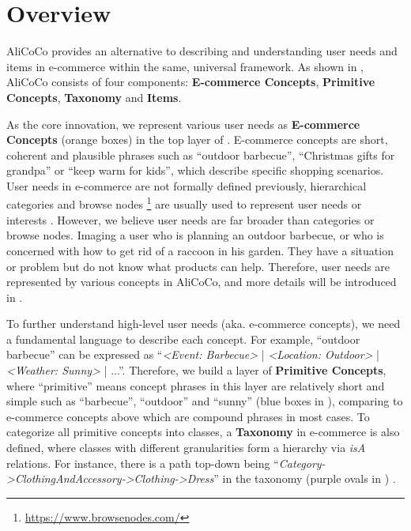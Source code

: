 \section{Overview} 
\label{sec:overview}


AliCoCo provides an alternative to describing and understanding user needs and items in e-commerce within the same, universal framework.
As shown in , 
AliCoCo consists of four components:
\textbf{E-commerce Concepts}, \textbf{Primitive Concepts}, \textbf{Taxonomy} and \textbf{Items}.


As the core innovation, 
we represent various user needs as \textbf{E-commerce Concepts} (orange boxes) in the top layer of .
E-commerce concepts are short, coherent and plausible phrases such as ``outdoor barbecue'', ``Christmas gifts for grandpa''
or ``keep warm for kids'', which describe specific shopping scenarios.
User needs in e-commerce are not formally defined previously,
hierarchical categories and browse nodes \footnote{\url{https://www.browsenodes.com/}} are usually used to represent user needs or interests \cite{zhou2018deep}.
However, we believe user needs are far broader than categories or browse nodes. 
Imaging a user who is planning an outdoor barbecue, or who is concerned with how to get rid of a raccoon in his garden.
They have a situation or problem but do not know what products can help.
Therefore, user needs are represented by various concepts in AliCoCo,
and more details will be introduced in .


To further understand high-level user needs (aka. e-commerce concepts), 
we need a fundamental language to describe each concept.
For example, ``outdoor barbecue'' can be expressed as ``\textit{<Event: Barbecue>} | \textit{<Location: Outdoor>} | \textit{<Weather: Sunny>} | ...''.
Therefore, 
we build a layer of \textbf{Primitive Concepts}, where
``primitive'' means concept phrases in this layer are relatively short and simple such as ``barbecue'', ``outdoor'' and ``sunny'' (blue boxes in ), 
comparing to e-commerce concepts above which are compound phrases in most cases.
To categorize all primitive concepts into classes, a \textbf{Taxonomy} in e-commerce is also defined, where classes with different granularities form a hierarchy via \textit{isA} relations.
For instance, there is a path top-down being ``\textit{Category->ClothingAndAccessory->Clothing->Dress}'' in the taxonomy (purple ovals in ) .

